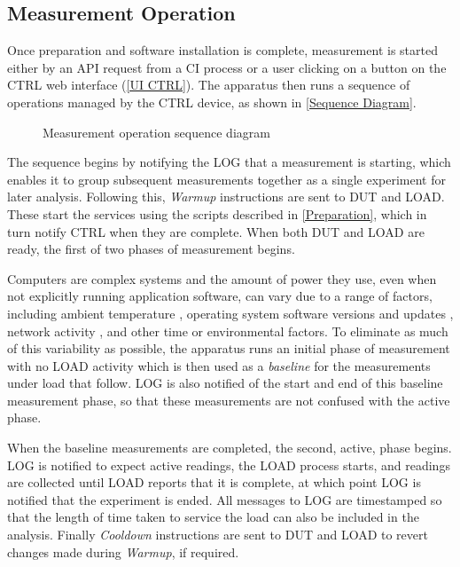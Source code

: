 \subsection{Measurement Operation}
\label{Measurement}

Once preparation and software installation is complete, measurement is started either by an API request from a CI process or a user clicking on a button on the CTRL web interface (\autoref{UI CTRL}). The apparatus then runs a sequence of operations managed by the CTRL device, as shown in \autoref{Sequence Diagram}.

\begin{figure}[htbp]
  \centering
  
  \caption{Measurement operation sequence diagram}
  \label{Sequence Diagram}
\end{figure}

The sequence begins by notifying the LOG that a measurement is starting, which enables it to group subsequent measurements together as a single experiment for later analysis. Following this, \emph{Warmup} instructions are sent to DUT and LOAD. These start the services using the scripts described in \autoref{Preparation}, which in turn notify CTRL when they are complete. When both DUT and LOAD are ready, the first of two phases of measurement begins.

Computers are complex systems and the amount of power they use, even when not explicitly running application software, can vary due to a range of factors, including ambient temperature \citep{Jin2022}, operating system software versions and updates \citep{Williams2015}, network activity \citep{Canek2022}, and other time or environmental factors. To eliminate as much of this variability as possible, the apparatus runs an initial phase of measurement with no LOAD activity which is then used as a \emph{baseline} for the measurements under load that follow. LOG is also notified of the start and end of this baseline measurement phase, so that these measurements are not confused with the active phase.

When the baseline measurements are completed, the second, active, phase begins. LOG is notified to expect active readings, the LOAD process starts, and readings are collected until LOAD reports that it is complete, at which point LOG is notified that the experiment is ended. All messages to LOG are timestamped so that the length of time taken to service the load can also be included in the analysis. Finally \emph{Cooldown} instructions are sent to DUT and LOAD to revert changes made during \emph{Warmup}, if required.

